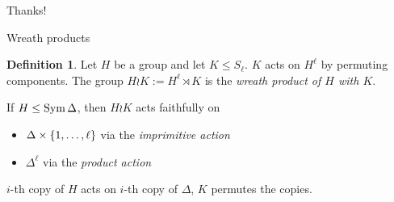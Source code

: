 \documentclass{beamer}
\theoremstyle{plain}
\theoremstyle{definition}
\newtheorem{defn}[thm]{Definition}
\begin{document}
\begin{frame}[standout]
Thanks!
\end{frame}

\printbibliography
\appendix


\begin{frame}{Wreath products}
\begin{defn}
    Let $H$ be a group and let $K \leq S_\ell$.
    $K$ acts on $H ^ \ell$ by permuting components.
    The group
    $H \wr K := H ^ \ell \rtimes K$
    is the \emph{wreath product of $H$ with $K$}.
\end{defn}

\pause
If $H \leq \operatorname{Sym} \Delta$, then $H \wr K$ acts faithfully on
\begin{itemize}
\item $\Delta \times  \left\{ 1, \ldots, \ell \right\} $ via the \emph{imprimitive action}
\item $\Delta ^ \ell$ via the \emph{product action}
\end{itemize}

$i$-th copy of $H$ acts on $i$-th copy of $\Delta$, $K$ permutes the copies.
\end{frame}

\end{document}
